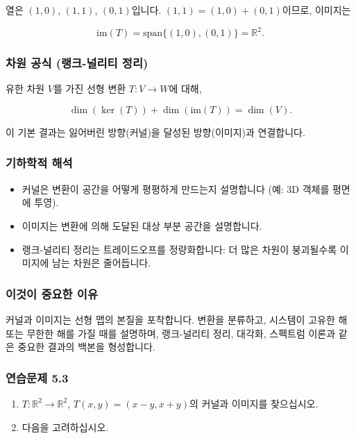 \documentclass[
  12pt,
  a4paper,
]{article}
\begin{document}
열은 \((1,0)\), \((1,1)\), \((0,1)\)입니다. \((1,1) = (1,0) + (0,1)\)이므로, 이미지는

\[\text{im}(T) = \text{span}\{ (1,0), (0,1) \} = \mathbb{R}^2.\]

\subsubsection{차원 공식 (랭크-널리티 정리)}\label{dimension-formula-rank--nullity-theorem}

유한 차원 \(V\)를 가진 선형 변환 \(T: V \to W\)에 대해,

\[\dim(\ker(T)) + \dim(\text{im}(T)) = \dim(V).\]

이 기본 결과는 잃어버린 방향(커널)을 달성된 방향(이미지)과 연결합니다.

\subsubsection{기하학적 해석}\label{geometric-interpretation-10}

\begin{itemize}
\item
  커널은 변환이 공간을 어떻게 평평하게 만드는지 설명합니다 (예: 3D 객체를 평면에 투영).
\item
  이미지는 변환에 의해 도달된 대상 부분 공간을 설명합니다.
\item
  랭크-널리티 정리는 트레이드오프를 정량화합니다: 더 많은 차원이 붕괴될수록 이미지에 남는 차원은 줄어듭니다.
\end{itemize}

\subsubsection{이것이 중요한 이유}\label{why-this-matters-18}

커널과 이미지는 선형 맵의 본질을 포착합니다. 변환을 분류하고, 시스템이 고유한 해 또는 무한한 해를 가질 때를 설명하며, 랭크-널리티 정리, 대각화, 스펙트럼 이론과 같은 중요한 결과의 백본을 형성합니다.

\subsubsection{연습문제 5.3}\label{exercises-53}

\begin{enumerate}
\def\labelenumi{\arabic{enumi}.}
\item
  \(T:\mathbb{R}^2 \to \mathbb{R}^2\), \(T(x,y) = (x-y, x+y)\)의 커널과 이미지를 찾으십시오.
\item
  다음을 고려하십시오.
\end{enumerate}
\end{document}

